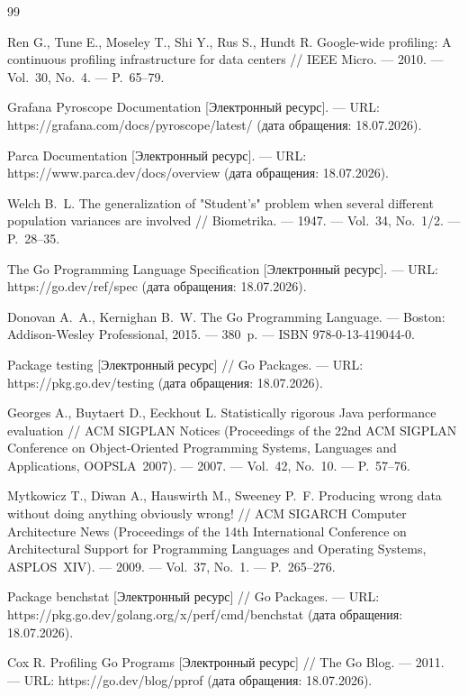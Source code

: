 \documentclass[12pt,a4paper]{article}
\numberwithin{equation}{section}
\begin{document}
\begin{thebibliography}{99}

Ren G., Tune E., Moseley T., Shi Y., Rus S., Hundt R. Google-wide profiling: A continuous profiling infrastructure for data centers // IEEE Micro. --- 2010. --- Vol.~30, No.~4. --- P.~65--79.

Grafana Pyroscope Documentation [Электронный ресурс]. --- URL: https://grafana.com/docs/pyroscope/latest/ (дата обращения: 18.07.2026).

Parca Documentation [Электронный ресурс]. --- URL: https://www.parca.dev/docs/overview (дата обращения: 18.07.2026).

Welch B.~L. The generalization of "Student's" problem when several different population variances are involved // Biometrika. --- 1947. --- Vol.~34, No.~1/2. --- P.~28--35.

The Go Programming Language Specification [Электронный ресурс]. --- URL: https://go.dev/ref/spec (дата обращения: 18.07.2026).

Donovan A.~A., Kernighan B.~W. The Go Programming Language. --- Boston: Addison-Wesley Professional, 2015. --- 380~p. --- ISBN 978-0-13-419044-0.

Package testing [Электронный ресурс] // Go Packages. --- URL: https://pkg.go.dev/testing (дата обращения: 18.07.2026).

Georges A., Buytaert D., Eeckhout L. Statistically rigorous Java performance evaluation // ACM SIGPLAN Notices (Proceedings of the 22nd ACM SIGPLAN Conference on Object-Oriented Programming Systems, Languages and Applications, OOPSLA~2007). --- 2007. --- Vol.~42, No.~10. --- P.~57--76.

Mytkowicz T., Diwan A., Hauswirth M., Sweeney P.~F. Producing wrong data without doing anything obviously wrong! // ACM SIGARCH Computer Architecture News (Proceedings of the 14th International Conference on Architectural Support for Programming Languages and Operating Systems, ASPLOS~XIV). --- 2009. --- Vol.~37, No.~1. --- P.~265--276.

Package benchstat [Электронный ресурс] // Go Packages. --- URL: https://pkg.go.dev/golang.org/x/perf/cmd/benchstat (дата обращения: 18.07.2026).

Cox R. Profiling Go Programs [Электронный ресурс] // The Go Blog. --- 2011. --- URL: https://go.dev/blog/pprof (дата обращения: 18.07.2026).


\end{thebibliography}
\end{document}
